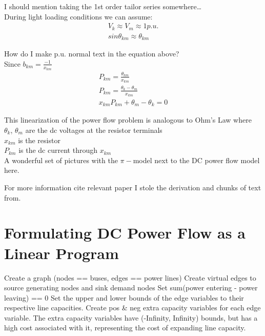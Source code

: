 I should mention taking the 1st order tailor series somewhere\ldots \\
During light loading conditions we can assume:
\begin{eqnarray}
V_k \approx V_m \approx 1 p.u. \\
sin\theta_{km} \approx \theta_{km}
\end{eqnarray}

How do I make p.u. normal text in the equation above? \\

Since $b_{km}=\frac{-1}{x_{km}}$
\begin{eqnarray}
P_{km} = \frac{\theta_{km}}{x_{km}} \\
P_{km} = \frac{\theta_k-\theta_m}{x_{km}} \\
x_{km}P_{km}+\theta_m-\theta_k = 0
\end{eqnarray}

This linearization of the power flow problem is analogous to Ohm's Law where \\
$\theta_k$, $\theta_m$ are the dc voltages at the resistor terminals \\
$x_{km}$ is the resistor \\
$P_{km}$ is the dc current through $x_{km}$ \\

A wonderful set of pictures with the $\pi-$model next to the DC power flow model here.

For more information cite relevant paper I stole the derivation and chunks of text from.

\section{Formulating DC Power Flow as a Linear Program}
Create a graph (nodes == buses, edges == power lines)
Create virtual edges to source generating nodes and sink demand nodes
Set sum(power entering - power leaving) == 0
Set the upper and lower bounds of the edge variables to their respective line capacities.
Create pos & neg extra capacity variables for each edge variable. The extra capacity variables have (-Infinity, Infinity) bounds, but has a high cost associated with it, representing the cost of expanding line capacity.
